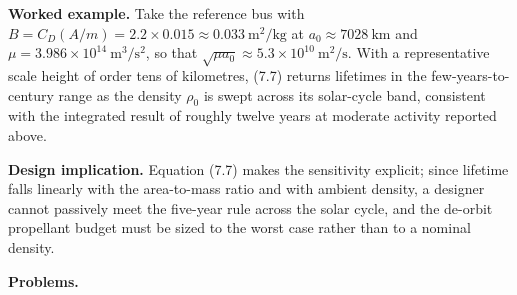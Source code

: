 \documentclass[
  11pt,
  openany,
  oneside]{book}
\begin{document}
\textbf{Worked example.} Take the reference bus with
\(B = C_D (A/m) = 2.2 \times 0.015 \approx 0.033\ \mathrm{m^2/kg}\) at
\(a_0 \approx 7028\ \mathrm{km}\) and
\(\mu = 3.986\times 10^{14}\ \mathrm{m^3/s^2}\), so that
\(\sqrt{\mu a_0} \approx 5.3\times 10^{10}\ \mathrm{m^2/s}\). With a
representative scale height of order tens of kilometres, (7.7) returns
lifetimes in the few-years-to-century range as the density \(\rho_0\) is
swept across its solar-cycle band, consistent with the integrated result
of roughly twelve years at moderate activity reported above.

\textbf{Design implication.} Equation (7.7) makes the sensitivity
explicit; since lifetime falls linearly with the area-to-mass ratio and
with ambient density, a designer cannot passively meet the five-year
rule across the solar cycle, and the de-orbit propellant budget must be
sized to the worst case rather than to a nominal density.

\textbf{Problems.}
\end{document}
